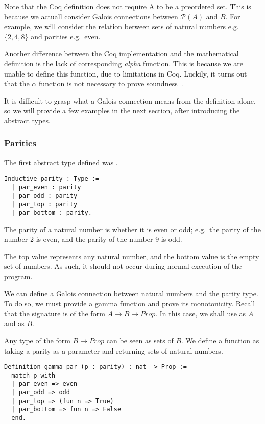Note that the Coq definition does not require A to be a preordered set. This is
because we actuall consider Galois connections between $\mathcal{P}(A)$ and
$B$. For example, we will consider the relation between sets of natural numbers
e.g.\ $\{2, 4, 8\}$ and parities e.g.\ even.

Another difference between the Coq implementation and the mathematical
definition is the lack of corresponding \textit{alpha} function. This is
because we are unable to define this function, due to limitations in Coq.
Luckily, it turns out that the $\alpha$ function is not necessary to prove
soundness~\cite{jourdan2016verasco}.

It is difficult to grasp what a Galois connection means from the definition
alone, so we will provide a few examples in the next section, after
introducing the abstract types.

\subsubsection{Parities}
The first abstract type defined was .

\begin{verbatim}
Inductive parity : Type :=
  | par_even : parity
  | par_odd : parity
  | par_top : parity
  | par_bottom : parity.
\end{verbatim}

The parity of a natural number is whether it is even or odd; e.g.\ the parity
of the number 2 is even, and the parity of the number 9 is odd.

The top value represents any natural number, and the bottom value is the empty
set of numbers. As such, it should not occur during normal execution of the 
program.

We can define a Galois connection between natural numbers and the parity type.
To do so, we must provide a gamma function and prove its monotonicity. Recall
that the signature is of the form $A \rightarrow B \rightarrow Prop$. In this
case, we shall use  as $A$ and  as $B$.

Any type of the form $B \rightarrow Prop$ can be seen as sets of $B$. We define
a function  as taking a parity as a parameter and returning
sets of natural numbers.

\begin{verbatim}
Definition gamma_par (p : parity) : nat -> Prop :=
  match p with
  | par_even => even 
  | par_odd => odd 
  | par_top => (fun n => True)
  | par_bottom => fun n => False
  end.
\end{verbatim}

